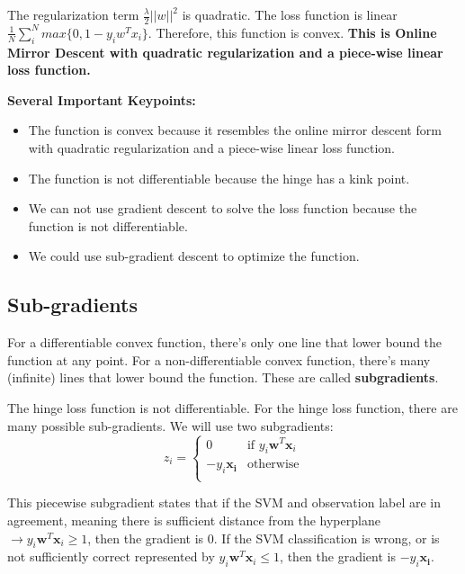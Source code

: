 \documentclass[11pt]{article}
\begin{document}
The regularization term $\frac{\lambda}{2}||w||^2$ is quadratic. The loss function is linear $ \frac{1}{N}\sum_{i}^N max\{0,1-y_i w^T x_i\}$. Therefore, this function is convex. \textbf{This is Online Mirror Descent with quadratic regularization and a piece-wise linear loss function.}

\textbf{Several Important Keypoints:}
\begin{itemize}
    \item The function is convex because it resembles the online mirror descent form with quadratic regularization and a piece-wise linear loss function.
    \item The function is not differentiable because the hinge has a kink point.
    \item We can not use gradient descent to solve the loss function because the function is not differentiable.
    \item We could use sub-gradient descent to optimize the function.
\end{itemize}

\subsection{Sub-gradients}
For a differentiable convex function, there's only one line that lower bound the function at any point.
For a non-differentiable convex function, there's many (infinite) lines that lower bound the function. These are called \textbf{subgradients}.


The hinge loss function is not differentiable. For the hinge loss function, there are many possible sub-gradients. 
We will use two subgradients:
\begin{equation}
  z_i =
    \begin{cases}
      0 & \text{if } y_i \mathbf{w}^T \mathbf{x}_i\\
      -y_i \mathbf{x_i} & \text{otherwise}\\
    \end{cases}       
\end{equation}

This piecewise subgradient states that if the SVM and observation label are in agreement, meaning there is sufficient distance from the hyperplane $\rightarrow y_i \mathbf{w}^T \mathbf{x}_i \geq 1$, then the gradient is 0. If the SVM classification is wrong, or is not sufficiently correct represented by $y_i \mathbf{w}^T \mathbf{x}_i \leq 1$, then the gradient is $-y_i \mathbf{x_i}$.
\end{document}
